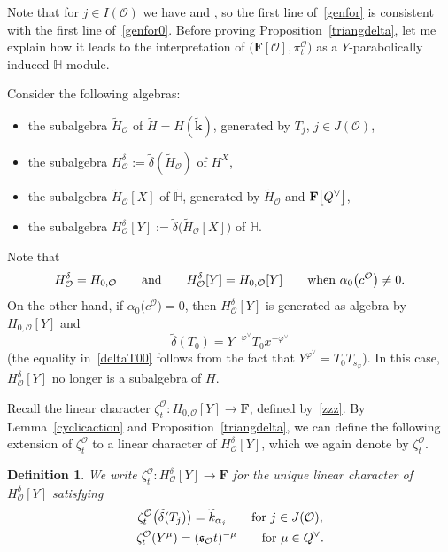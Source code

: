 \documentclass[pdftex]{sigma}
\numberwithin{equation}{section}
\newtheorem{Definition}[Theorem]{Definition}
\begin{document}
Note that for $j\in I(\mathcal{O})$ we have 
and , so the first line of~\eqref{genfor} is consistent with the first line of~\eqref{genfor0}.
Before proving Proposition~\ref{triangdelta}, let me explain how it leads to the interpretation of $\bigl(\mathbf{F}[\mathcal{O}],\pi_t^\mathcal{O}\bigr)$ as a $Y$-parabolically induced $\mathbb{H}$-module.

Consider the following algebras:
\begin{itemize}\itemsep=0pt
\item the subalgebra $\widetilde{H}_\mathcal{O}$ of $\widetilde{H}=H(\widetilde{\mathbf{k}})$, generated by $T_j$, $j\in J(\mathcal{O})$,
\item the subalgebra $H_\mathcal{O}^\delta:=\widetilde{\delta}(\widetilde{H}_\mathcal{O})$ of $H^X$,
\item the subalgebra $\widetilde{H}_\mathcal{O}[X]$ of $\widetilde{\mathbb{H}}$, generated by $\widetilde{H}_{\mathcal{O}}$ and $\mathbf{F}\smash{\bigl[Q^\vee\bigr]}$,
\item the subalgebra $H_\mathcal{O}^\delta[Y]:=\widetilde{\delta}\bigl(\widetilde{H}_\mathcal{O}[X]\bigr)$ of $\mathbb{H}$.
\end{itemize}
Note that
\[
H_{\mathcal{O}}^\delta=H_{0,\mathcal{O}}\qquad \textup{and}\qquad H_{\mathcal{O}}^\delta[Y]=H_{0,\mathcal{O}}[Y]\qquad \textup{when}\ \alpha_0\bigl(c^\mathcal{O}\bigr)\not=0.
\]
On the other hand, if $\alpha_0\bigl(c^\mathcal{O}\bigr)=0$,
then $H_{\mathcal{O}}^\delta[Y]$ is generated as algebra by $H_{0,\mathcal{O}}[Y]$ and
\begin{equation}\label{deltaT00}
\widetilde{\delta}(T_0)=Y^{-\varphi^\vee}T_0x^{-\varphi^\vee}
\end{equation}
\big(the equality in~\eqref{deltaT00} follows from the fact that $Y^{\varphi^\vee}=T_0T_{s_\varphi}$\big). In this case, $H_\mathcal{O}^\delta[Y]$ no longer is a subalgebra of $H$.

Recall the linear character $\zeta_t^\mathcal{O}\colon
H_{0,\mathcal{O}}[Y]\rightarrow\mathbf{F}$, defined by~\eqref{zzz}. By Lemma~\ref{cyclicaction} and Proposition~\ref{triangdelta}, we can define the following extension of
$\zeta_t^\mathcal{O}$ to a linear character
of $H_\mathcal{O}^\delta[Y]$, which we again denote by $\zeta_t^\mathcal{O}$.

\begin{Definition}We write $\zeta_t^\mathcal{O}\colon H_{\mathcal{O}}^\delta[Y]\rightarrow\mathbf{F}$ for the unique linear character of $H_{\mathcal{O}}^\delta[Y]$
satisfying
\begin{gather*}
\zeta_t^\mathcal{O}\bigl(\widetilde{\delta}(T_j)\bigr)=\widetilde{k}_{\alpha_j}\qquad \textup{for}\ j\in J(\mathcal{O}),\\
\zeta_t^\mathcal{O} (Y^\mu )= (\mathfrak{s}_\mathcal{O}t )^{-\mu}\qquad \textup{for}\ \mu\in Q^\vee.
\end{gather*}
\end{Definition}
\end{document}
